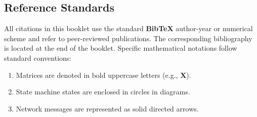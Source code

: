 \vspace{1.5cm}

\subsection*{Reference Standards}

All citations in this booklet use the standard \textbf{BibTeX} author-year or numerical scheme and refer to peer-reviewed publications. The corresponding bibliography is located at the end of the booklet. Specific mathematical notations follow standard conventions:
\begin{enumerate}
  \item Matrices are denoted in bold uppercase letters (e.g., $\mathbf{X}$).
  \item State machine states are enclosed in circles in diagrams.
  \item Network messages are represented as solid directed arrows.
\end{enumerate}
